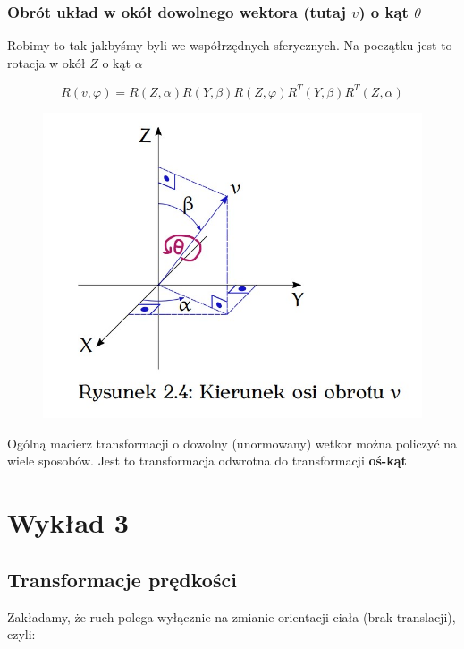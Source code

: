 \documentclass{article}
\begin{document}
\subsubsection{Obrót układ w okół dowolnego wektora (tutaj $v$) o kąt $\theta$}

Robimy to tak jakbyśmy byli we współrzędnych sferycznych. Na początku jest to rotacja w okół $Z$ o kąt $\alpha$

\Large
$$
    R\left(v, \varphi\right)=
    R(Z, \alpha)R(Y,\beta)R(Z, \varphi)R^{T}(Y, \beta)R^{T}(Z, \alpha)
$$
\normalsize


\begin{figure}[h!]
    \centering
    \includegraphics[scale=0.5]{img/kierunek_osi_obrotu.jpg}
\end{figure}

Ogólną macierz transformacji o dowolny (unormowany) wetkor można policzyć na wiele sposobów.
Jest to transformacja odwrotna do transformacji {\bf oś-kąt}

\newpage

\section{Wykład 3}

\subsection{Transformacje prędkości}

Zakładamy, że ruch polega wyłącznie na zmianie orientacji ciała (brak translacji), czyli:
\end{document}
